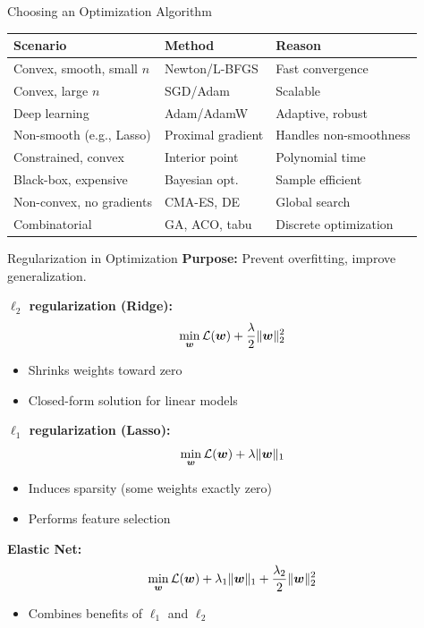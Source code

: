 \documentclass[aspectratio=169]{beamer}
\begin{document}
\begin{frame}{Choosing an Optimization Algorithm}
  \begin{table}
    \centering
    \footnotesize
    \begin{tabular}{lp{4cm}p{4cm}}
      \toprule
      \textbf{Scenario} & \textbf{Method} & \textbf{Reason} \\
      \midrule
      Convex, smooth, small $n$ & Newton/L-BFGS & Fast convergence \\
      Convex, large $n$ & SGD/Adam & Scalable \\
      Deep learning & Adam/AdamW & Adaptive, robust \\
      Non-smooth (e.g., Lasso) & Proximal gradient & Handles non-smoothness \\
      Constrained, convex & Interior point & Polynomial time \\
      Black-box, expensive & Bayesian opt. & Sample efficient \\
      Non-convex, no gradients & CMA-ES, DE & Global search \\
      Combinatorial & GA, ACO, tabu & Discrete optimization \\
      \bottomrule
    \end{tabular}
  \end{table}
\end{frame}

\begin{frame}{Regularization in Optimization}
  \textbf{Purpose:} Prevent overfitting, improve generalization.

  \vspace{0.5em}

  \textbf{$\ell_2$ regularization (Ridge):}
  $$\min_{\boldsymbol{w}} \mathcal{L}(\boldsymbol{w}) + \frac{\lambda}{2}\|\boldsymbol{w}\|_2^2$$
  \begin{itemize}
    \item Shrinks weights toward zero
    \item Closed-form solution for linear models
  \end{itemize}

  \vspace{0.5em}

  \textbf{$\ell_1$ regularization (Lasso):}
  $$\min_{\boldsymbol{w}} \mathcal{L}(\boldsymbol{w}) + \lambda\|\boldsymbol{w}\|_1$$
  \begin{itemize}
    \item Induces sparsity (some weights exactly zero)
    \item Performs feature selection
  \end{itemize}

  \vspace{0.5em}

  \textbf{Elastic Net:}
  $$\min_{\boldsymbol{w}} \mathcal{L}(\boldsymbol{w}) + \lambda_1\|\boldsymbol{w}\|_1 + \frac{\lambda_2}{2}\|\boldsymbol{w}\|_2^2$$
  \begin{itemize}
    \item Combines benefits of $\ell_1$ and $\ell_2$
  \end{itemize}
\end{frame}
\end{document}
